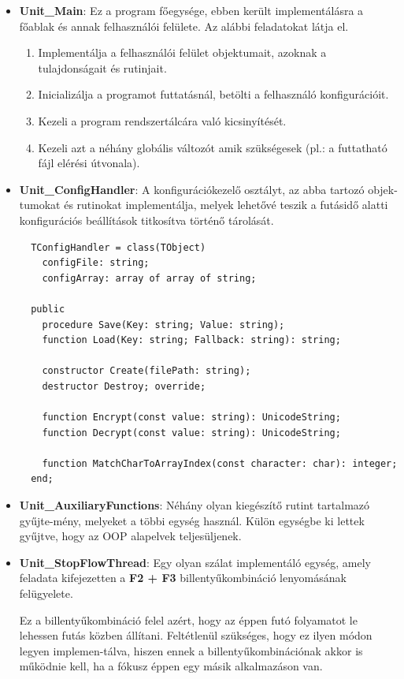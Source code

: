 \begin{itemize}
	\item{
		\textbf{Unit\_Main}: Ez a program főegysége, ebben került implementálásra a főablak és annak felhasználói felülete. Az alábbi feladatokat látja el.
		\begin{enumerate}
			\item{Implementálja a felhasználói felület objektumait, azoknak a tulajdonságait és rutinjait.}
			\item{Inicializálja a programot futtatásnál, betölti a felhasználó konfigurációit.}
			\item{Kezeli a program rendszertálcára való kicsinyítését.}
			\item{Kezeli azt a néhány globális változót amik szükségesek (pl.: a futtatható fájl elérési útvonala).}			
		\end{enumerate}
	}
	\item{
		\textbf{Unit\_ConfigHandler}: A konfigurációkezelő osztályt, az abba tartozó objek\hyp{}tumokat és rutinokat implementálja, melyek lehetővé teszik a futásidő alatti konfigurációs beállítások titkosítva történő tárolását.
		\begin{lstlisting}
  TConfigHandler = class(TObject)
    configFile: string;
    configArray: array of array of string;

  public
    procedure Save(Key: string; Value: string);
    function Load(Key: string; Fallback: string): string;

    constructor Create(filePath: string);
    destructor Destroy; override;

    function Encrypt(const value: string): UnicodeString;
    function Decrypt(const value: string): UnicodeString;

    function MatchCharToArrayIndex(const character: char): integer;
  end;
		\end{lstlisting}
	}
	\item{
		\textbf{Unit\_AuxiliaryFunctions}: Néhány olyan kiegészítő rutint tartalmazó gyűjte\hyp{}mény, melyeket a többi egység használ. Külön egységbe ki lettek gyűjtve, hogy az OOP alapelvek teljesüljenek.
	}
	\item{
		\textbf{Unit\_StopFlowThread}: Egy olyan szálat implementáló egység, amely feladata kifejezetten a \textbf{F2 + F3} billentyűkombináció lenyomásának felügyelete.

		Ez a billentyűkombináció felel azért, hogy az éppen futó folyamatot le lehessen futás közben állítani. Feltétlenül szükséges, hogy ez ilyen módon legyen implemen\hyp{}tálva, hiszen ennek a billentyűkombinációnak akkor is működnie kell, ha a fókusz éppen egy másik alkalmazáson van.

}
\end{itemize}
